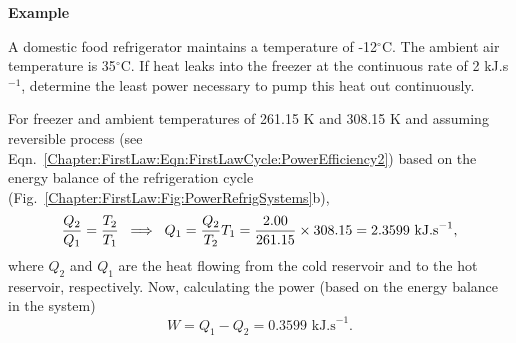    \begin{MyExample}{\begin{center}{\bf Example}\end{center}}
     \begin{example}\label{Chapter:SecondLaw:Example2}\citep{Rajput_Book}
        A domestic food refrigerator maintains a temperature of -12$^{\circ}$C. The ambient air temperature is 35$^{\circ}$C. If heat leaks into the freezer at the continuous rate of 2 kJ.s$^{-1}$, determine the least power necessary to pump this heat out continuously.
     \end{example}

       For freezer and ambient temperatures of 261.15 K and 308.15 K and assuming reversible process (see Eqn.~\ref{Chapter:FirstLaw:Eqn:FirstLawCycle:PowerEfficiency2}) based on the energy balance of the refrigeration cycle (Fig.~\ref{Chapter:FirstLaw:Fig:PowerRefrigSystems}b), 
       \begin{displaymath}
          \displaystyle\frac{Q_{2}}{Q_{1}} = \displaystyle\frac{T_{2}}{T_{1}} \;\;\Longrightarrow \;\;Q_{1} = \displaystyle\frac{Q_{2}}{T_{2}}T_{1} = \displaystyle\frac{2.00}{261.15}\times 308.15 = 2.3599\text{ kJ.s}^{-1},
       \end{displaymath}
       where $Q_{2}$ and $Q_{1}$ are the heat flowing from the cold reservoir and to the hot reservoir, respectively. Now, calculating the power (based on the energy balance in the system)
       \begin{displaymath}
          W = Q_{1}-Q_{2} = 0.3599\text{ kJ.s}^{-1}.
       \end{displaymath}
   \end{MyExample}
   

